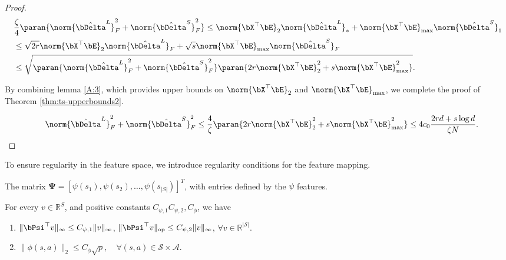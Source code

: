 \begin{proof}
    \begin{equation}
     \begin{aligned}
      &\frac{\zeta}{4} \paran{ \norm{\hat\bDelta^L}_F^2 + \norm{\hat\bDelta^{S}}_F^2 }
      \leq \norm{\bX^\top \bE}_2\norm{\hat\bDelta^L}_* + \norm{\bX^\top \bE}_{\max}\norm{\hat\bDelta^{S}}_1\\
      &
      \leq \sqrt{2r}\norm{\bX^\top \bE}_2\norm{\hat\bDelta^L}_F + \sqrt{s}\norm{\bX^\top \bE}_{\max}\norm{\hat\bDelta^{S}}_F\\
      &\leq \sqrt{ \paran{\norm{\hat\bDelta^L}_F^2 + \norm{\hat\bDelta^{S}}_F^2}\paran{2r\norm{\bX^\top \bE}_2^2+s\norm{\bX^\top \bE}_{\max}^2}}.
     \end{aligned}
     \end{equation}
     
     By combining lemma \ref{A:3}, which provides upper bounds on 
    $\norm{\bX^{\top}\bE}_2$ and $\norm{\bX^{\top}\bE}_{\max}$, we complete the proof of Theorem \ref{thm:ts-upperbounds2}.

     \begin{equation}
     \begin{aligned}
	 \quad\norm{\hat\bDelta^L}_F^2+\norm{\hat\bDelta^{S}}_F^2\leq \frac{4}{\zeta}\paran{2r\norm{\bX^\top \bE}_2^2+s\norm{\bX^\top \bE}_{\max}^2}
     \leq 4c_0\frac{2rd+s\log d}{\zeta N}.
     \end{aligned}
     \end{equation}
\end{proof}

To ensure regularity in the feature space, we introduce regularity conditions for the feature mapping.

The matrix $\boldsymbol{\Psi} =[\psi(s_1), \psi(s_2), \ldots, \psi(s_{|S|})]^T$, with entries defined by the $\psi$ features.
\begin{assumption}
For every $v \in \mathbb{R}^S$, and positive constants $C_{\psi,1}C_{\psi,2},C_\phi$, we have

\begin{enumerate}
  \item $\|\bPsi^{\top} v\|_{\infty} \leq C_{\psi,1} \|v\|_{\infty}$, $\|\bPsi^{\top} v\|_{\text{op}} \leq C_{\psi,2} \|v\|_{\infty}$,  $\forall v \in \mathbb{R}^{|\mathcal{S}|}$.
  
  \item $\|\phi(s, a)\|_2 \leq C_\phi \sqrt{p}, \quad \forall (s, a) \in \mathcal{S} \times \mathcal{A}$.
\end{enumerate}
\label{ass-recon}
\end{assumption}
    
